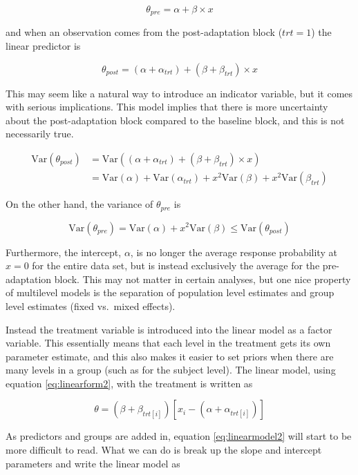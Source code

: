 \documentclass[11pt, oneside, openany]{scrbook}
\begin{document}
\[
\theta_{pre} = \alpha + \beta \times x
\]

and when an observation comes from the post-adaptation block (\(trt=1\)) the linear predictor is

\[
\theta_{post} = (\alpha + \alpha_{trt}) + (\beta + \beta_{trt}) \times x
\]

This may seem like a natural way to introduce an indicator variable, but it comes with serious implications. This model implies that there is more uncertainty about the post-adaptation block compared to the baseline block, and this is not necessarily true.

\begin{align*}
\mathrm{Var}(\theta_{post}) &= \mathrm{Var}((\alpha + \alpha_{trt}) + (\beta + \beta_{trt}) \times x) \\
&= \mathrm{Var}(\alpha) + \mathrm{Var}(\alpha_{trt}) + x^2 \mathrm{Var}(\beta) + x^2\mathrm{Var}(\beta_{trt})
\end{align*}

On the other hand, the variance of \(\theta_{pre}\) is

\[
\mathrm{Var}(\theta_{pre}) = \mathrm{Var}(\alpha) + x^2 \mathrm{Var}(\beta) \le \mathrm{Var}(\theta_{post})
\]

Furthermore, the intercept, \(\alpha\), is no longer the average response probability at \(x=0\) for the entire data set, but is instead exclusively the average for the pre-adaptation block. This may not matter in certain analyses, but one nice property of multilevel models is the separation of population level estimates and group level estimates (fixed vs.~mixed effects).

Instead the treatment variable is introduced into the linear model as a factor variable. This essentially means that each level in the treatment gets its own parameter estimate, and this also makes it easier to set priors when there are many levels in a group (such as for the subject level). The linear model, using equation \eqref{eq:linearform2}, with the treatment is written as

\begin{equation}
  \theta = (\beta + \beta_{trt[i]}) \left[x_i - (\alpha + \alpha_{trt[i]})\right]
  \label{eq:linearmodel2}
\end{equation}

As predictors and groups are added in, equation \eqref{eq:linearmodel2} will start to be more difficult to read. What we can do is break up the slope and intercept parameters and write the linear model as
\end{document}

